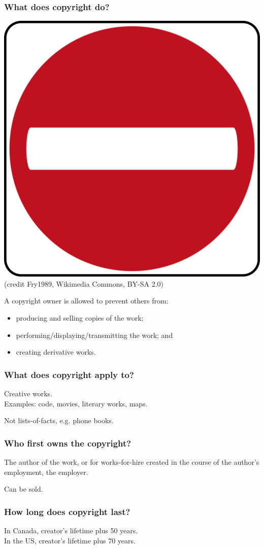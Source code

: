 \begin{frame}
\frametitle{What does copyright do?}
\large
\begin{changemargin}{1cm}
\begin{center}
\includegraphics[width=.2\textwidth]{images/L04-do-not-enter.png}
\\
{\tiny (credit Fry1989, Wikimedia Commons, BY-SA 2.0)}
\end{center}
A copyright owner is allowed to prevent others from:
\vspace*{-1em}
\begin{itemize}
   \item producing and selling copies of the work;
   \item performing/displaying/transmitting the work; and
   \item creating derivative works.
\end{itemize}
\end{changemargin}

\end{frame}


\begin{frame}
\frametitle{What does copyright apply to?}
\Large
\begin{changemargin}{1cm}
Creative works.\\
Examples: code, movies, literary works, maps.

\vspace*{-2em}
Not lists-of-facts,
e.g. phone books.
\end{changemargin}
\end{frame}

\begin{frame}
\frametitle{Who first owns the copyright?}

\begin{changemargin}{1cm}
\Large
\vspace*{-1em}
The author of the work, or for works-for-hire created in the
course of the author's employment, the employer.

Can be sold.
\end{changemargin}
\end{frame}


\begin{frame}
\frametitle{How long does copyright last?}

\begin{changemargin}{1cm}
\Large
\vspace*{-1em}
In Canada, creator's lifetime plus 50 years. \\
In the US, creator's lifetime plus 70 years.
\end{changemargin}
\end{frame}


